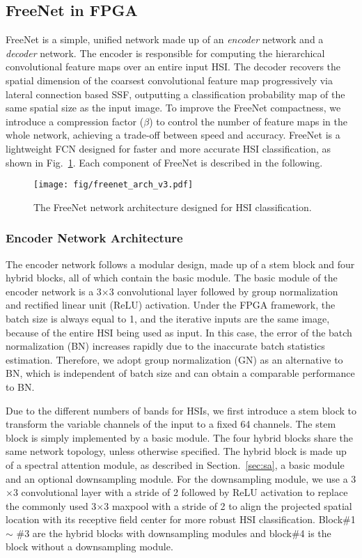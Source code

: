 \documentclass[journal]{IEEEtran}
\begin{document}
\subsection{FreeNet in FPGA}
FreeNet is a simple, unified network made up of an \textit{encoder} network and a \textit{decoder} network.
The encoder is responsible for computing the hierarchical convolutional feature maps over an entire input HSI.
The decoder recovers the spatial dimension of the coarsest convolutional feature map progressively via lateral connection based SSF, outputting a classification probability map of the same spatial size as the input image.
To improve the FreeNet compactness, we introduce a compression factor ($\beta$) to control the number of feature maps in the whole network, achieving a trade-off between speed and accuracy.
FreeNet is a lightweight FCN designed for faster and more accurate HSI classification, as shown in Fig.~\ref{fig:freenet}.
Each component of FreeNet is described in the following.
\begin{figure}[hbt]
  \centering
  \texttt{[image: fig/freenet\_arch\_v3.pdf]}
  \caption{The FreeNet network architecture designed for HSI classification.}
  \label{fig:freenet}
\end{figure}
\subsubsection{\textbf{Encoder Network Architecture}}
The encoder network follows a modular design, made up of a stem block and four hybrid blocks, all of which contain the basic module.
The basic module of the encoder network is a 3$\times$3 convolutional layer followed by group normalization \cite{wu2018group} and rectified linear unit (ReLU) activation.
Under the FPGA framework, the batch size is always equal to 1, and the iterative inputs are the same image, because of the entire HSI being used as input.
In this case, the error of the batch normalization (BN) increases rapidly due to the inaccurate batch statistics estimation.
Therefore, we adopt group normalization (GN) as an alternative to BN, which is independent of batch size and can obtain a comparable performance to BN.

Due to the different numbers of bands for HSIs, we first introduce a stem block to transform the variable channels of the input to a fixed 64 channels.
The stem block is simply implemented by a basic module.
The four hybrid blocks share the same network topology, unless otherwise specified.
The hybrid block is made up of a spectral attention module, as described in Section.~\ref{sec:sa}, a basic module and an optional downsampling module.
For the downsampling module, we use a 3$\times$3 convolutional layer with a stride of 2 followed by ReLU activation to replace the commonly used 3$\times$3 maxpool with a stride of 2 to align the projected spatial location with its receptive field center for more robust HSI classification.
Block\#1 $\sim$ \#3 are the hybrid blocks with downsampling modules and block\#4 is the block without a downsampling module.
\end{document}
